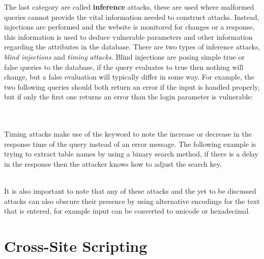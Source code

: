 The last category are called \textbf{inference} attacks, these are used where malformed queries cannot provide the vital information needed to construct attacks.  Instead, injections are performed and the website is monitored for changes or a response, this information is used to deduce vulnerable parameters and other information regarding the attributes in the database.  There are two types of inference attacks, \emph{blind injections} and \emph{timing attacks}. Blind injections are posing simple true or false queries to the database, if the query evaluates to true then nothing will change, but a false evaluation will typically differ in some way.  For example, the two following queries should both return an error if the input is handled properly, but if only the first one returns an error than the login parameter is vulnerable:  

\noindent
{}
\\

\noindent
{}
\\

Timing attacks make use of the  keyword to note the increase or decrease in the response time of the query instead of an error message.  The following example is trying to extract table names by using a binary search method, if there is a delay in the response then the attacker knows how to adjust the search key.

\noindent
{}
\\

It is also important to note that any of these attacks and the yet to be discussed attacks can also obscure their presence by using alternative encodings for the text that is entered, for example input can be converted to unicode or hexadecimal.\cite{aClassificationOfSQL}

\section{Cross-Site Scripting}\label{sec:xssExplanation}

